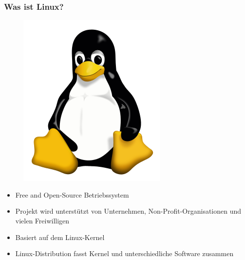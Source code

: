 \begin{frame}
\frametitle{Was ist Linux?}
\begin{figure}
\includegraphics[scale=0.17]{resources/tux.png}
\end{figure}
\begin{itemize}
\item Free and Open-Source Betriebssystem
\item Projekt wird unterstützt von Unternehmen, Non-Profit-Organisationen und vielen Freiwilligen
\item Basiert auf dem Linux-Kernel
\item Linux-Distribution fasst Kernel und unterschiedliche Software zusammen
\end{itemize}
\end{frame}


